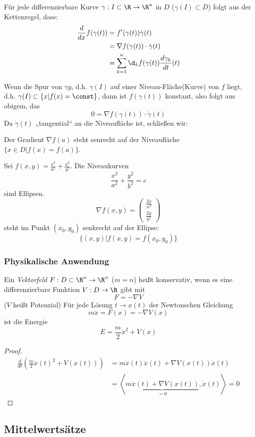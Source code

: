 \documentclass[a4paper,10pt]{scrartcl}
\begin{document}
Für jede differenzierbare Kurve $\gamma:I\subset \R\to \R^n$ in $D$ ($\gamma(I)\subset D$) folgt aus der Kettenregel, dass:
\begin{align*}
\frac d{dx}f(\gamma(t))&=f'(\gamma(t))\dot\gamma(t)\\
&=\nabla f(\gamma(t))\cdot \dot\gamma(t)\\
&=\sum_{k=1}^n\d_kf(\gamma(t))\frac{d\gamma_k}{dt}(t)
\end{align*}

Wenn die Spur von $\gamma y$, d.h. $\gamma(I)$ auf einer Niveau-Fläche(Kurve) von $f$ liegt, d.h.
$\gamma(I)\subset\{x|f(x)=\const\}$, dann ist $f(\gamma(t))$ konstant, also folgt aus obigem, das
\[
0=\nabla f(\gamma(t))\cdot \dot\gamma(t)
\]
Da $\dot\gamma(t)$ „tangential“ an die Niveaufläche ist, schließen wir:

Der Gradient $\nabla f(a)$ steht senrecht auf der Niveaufläche $\{x\in D|f(x)=f(a)\}$.

\begin{ex*}
Sei $f(x,y)=\frac{x^2}{a^2}+\frac{x^2}{b^2}$.
Die Niveaukurven 
\[
\frac{x^2}{a^2}+\frac{y^2}{b^2}=c
\]
sind Ellipsen.
\[
	\nabla f(x,y)=\begin{pmatrix}\frac{2x}{a^2} \\[0.3em] \frac{2y}{b^2}\end{pmatrix}
\]
steht im Punkt $(x_0,y_0)$ senkrecht auf der Ellipse:
\[
\{(x,y)|f(x,y)=f(x_0,y_0)\}
\]
\end{ex*}

\subsubsection*{Physikalische Anwendung}

Ein \emph{Vektorfeld} $F:D\subset \R^n\to \R^n$ ($m=n$) heißt konservativ, wenn es eine differenzierbare Funktion
$V:D\to \R$ gibt mit
\[
F=-\nabla V
\]
($V$ heißt Potenzial)
Für jede Lösung $t\to x(t)$ der Newtonschen Gleichung
\[
m\ddot x=F(x)=-\nabla V(x)
\]
ist die Energie
\[
E=\frac m2 \dot x^2+V(x)
\]
\begin{proof}
\begin{align*}
\frac{d}{dt}\left(\frac m2 \dot x(t)^2+V(x(t))\right) &= m\dot x(t)\ddot x(t) + \nabla V(x(t))\dot x(t)\\
&=\left<\underbrace{m\ddot x(t)+\nabla V(x(t))}_{=0}, \dot x(t)\right> = 0
\end{align*}
\end{proof}

\subsection{Mittelwertsätze}
\end{document}
